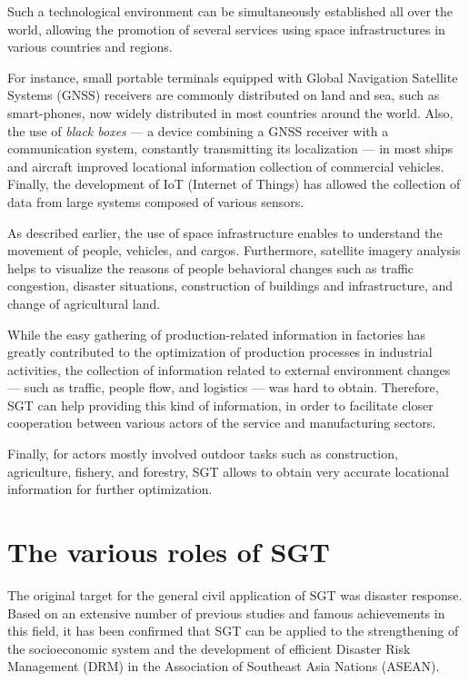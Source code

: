 \tab Such a technological environment can be simultaneously established all over the world, allowing the promotion of several services using space infrastructures in various countries and regions. 

For instance, small portable terminals equipped with Global Navigation Satellite Systems (GNSS) receivers are commonly distributed on land and sea, such as smart-phones, now widely distributed in most countries around the world. Also, the use of \textit{black boxes} --- a device combining a GNSS receiver with a communication system, constantly transmitting its localization --- in most ships and aircraft improved locational information collection of commercial vehicles. Finally, the development of IoT (Internet of Things) has allowed the collection of data from large systems composed of various sensors.

As described earlier, the use of space infrastructure enables to understand the movement of people, vehicles, and cargos. Furthermore, satellite imagery analysis helps to visualize the reasons of people behavioral changes such as traffic congestion, disaster situations, construction of buildings and infrastructure, and change of agricultural land.

\vspace{0.4 cm}

While the easy gathering of production-related information in factories has greatly contributed to the optimization of production processes in industrial activities, the collection of information related to external environment changes --- such as traffic, people flow, and logistics --- was hard to obtain. Therefore, SGT can help providing this kind of information, in order to facilitate closer cooperation between various actors of the service and manufacturing sectors. 

\vspace{0.4 cm}

Finally, for actors mostly involved outdoor tasks such as construction, agriculture, fishery, and forestry, SGT allows to obtain very accurate locational information for further optimization.

\section{The various roles of SGT}

The original target for the general civil application of SGT was disaster response. Based on an extensive number of previous studies and famous achievements in this field, it has been confirmed that SGT can be applied to the strengthening of the socioeconomic system and the development of efficient Disaster Risk Management (DRM) in the Association of Southeast Asia Nations (ASEAN).

